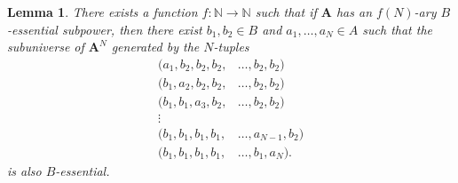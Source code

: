 \documentclass{amsart}
\theoremstyle{plain}
\newtheorem{lemma}[theorem]{Lemma}
\theoremstyle{definition}
\begin{document}
\begin{lemma}\label{lemRamsey}
  There exists a function $f:{{\mathbb N}}\to {{\mathbb N}}$ such that if ${{\mathbf{A}}}$ has  an $f(N)$-ary $B$-essential
  subpower, then there exist $b_1,b_2\in B$ and $a_{1},\dots,a_{N} \in A$ such
  that the subuniverse of ${{\mathbf{A}}}^N$ generated by the $N$-tuples
  \begin{align*}
    (a_1,b_2,b_2,b_2,&\dots,b_2,b_2)\\
    (b_1,a_2,b_2,b_2,&\dots,b_2,b_2)\\
    (b_1,b_1,a_3,b_2,&\dots,b_2,b_2)\\
    \vdots&\\
    (b_1,b_1,b_1,b_1,&\dots,a_{N-1},b_2)\\
  (b_1,b_1,b_1,b_1,&\dots,b_1,a_N).
  \end{align*}
is also $B$-essential.
\end{lemma}
\end{document}
